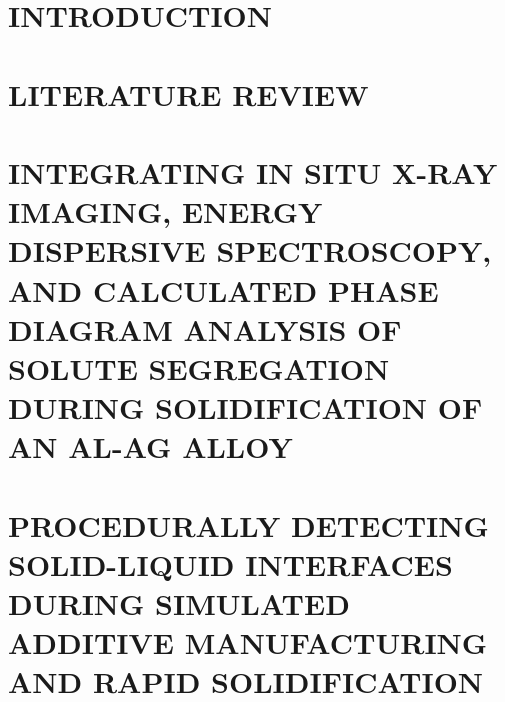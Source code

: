 \documentclass[letterpaper,12pt]{article} %
\begin{document}
\bodymatter     %

\chapter{INTRODUCTION} \label{ch/intro}




\chapter{LITERATURE REVIEW} \label{ch/lit-review}


\newpage
\chapter{
    INTEGRATING IN SITU X-RAY IMAGING, ENERGY DISPERSIVE SPECTROSCOPY,
    AND CALCULATED PHASE DIAGRAM ANALYSIS OF SOLUTE SEGREGATION
    DURING SOLIDIFICATION OF AN AL-AG ALLOY} \label{ch/xray}







\newpage
\chapter{
    PROCEDURALLY DETECTING SOLID-LIQUID INTERFACES DURING SIMULATED ADDITIVE
    MANUFACTURING AND RAPID SOLIDIFICATION} \label{ch/melt}







\end{document}
